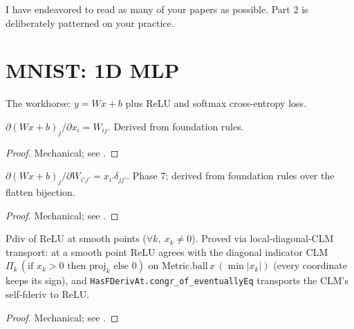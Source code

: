 \bigskip
\noindent I have endeavored to read as many of your papers as
possible. Part 2 is deliberately patterned on your practice.

\chapter{MNIST: 1D MLP}
\label{chap:mlp}

The workhorse: \(y = Wx + b\) plus ReLU and softmax cross-entropy loss.

\begin{theorem}
  \label{ax:pdiv_dense}
  \leanok
  \(\partial (Wx + b)_j / \partial x_i = W_{ij}\). Derived from foundation rules.
\end{theorem}

\begin{proof}
\leanok
Mechanical; see .
\end{proof}

\begin{theorem}
  \label{ax:pdiv_dense_W}
  \leanok
  \(\partial (Wx + b)_j / \partial W_{i'j'} = x_{i'} \delta_{jj'}\). Phase 7;
  derived from foundation rules over the flatten bijection.
\end{theorem}

\begin{proof}
\leanok
Mechanical; see .
\end{proof}

\begin{theorem}
  \label{ax:pdiv_relu}
  \leanok
  Pdiv of \(\mathrm{ReLU}\) at smooth points (\(\forall k,\ x_k \neq 0\)).
  Proved via local-diagonal-CLM transport: at a smooth point ReLU
  agrees with the diagonal indicator CLM
  \(\Pi_k\, (\text{if } x_k > 0 \text{ then } \mathrm{proj}_k \text{ else } 0)\)
  on \(\mathrm{Metric.ball}\, x\, (\min |x_k|)\) (every coordinate
  keeps its sign), and \texttt{HasFDerivAt.congr\_of\_eventuallyEq}
  transports the CLM's self-fderiv to ReLU.
\end{theorem}

\begin{proof}
\leanok
Mechanical; see .
\end{proof}

